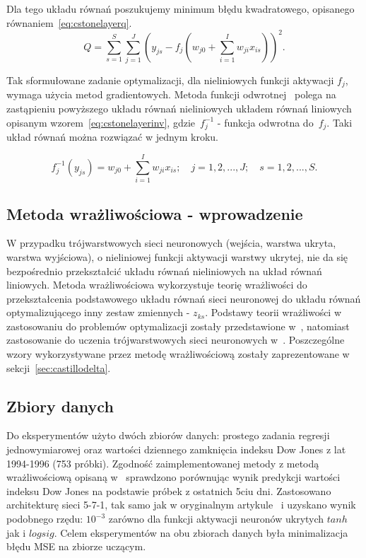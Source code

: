 \documentclass[11pt,a4paper]{article}
\begin{document}
Dla tego układu równań poszukujemy minimum błędu kwadratowego, opisanego równaniem~\ref{eq:cstonelayerq}.
\begin{equation}
Q = \sum_{s=1}^{S} \sum_{j=1}^{J} \left( y_{js} - f_j \left( w_{j0} + \sum_{i=1}^{I}w_{ji}x_{is} \right)\right)^{2}.
\label{eq:cstonelayerq}
\end{equation}

Tak sformułowane zadanie optymalizacji, dla nieliniowych funkcji aktywacji $f_j$, wymaga użycia metod gradientowych. Metoda funkcji odwrotnej~\cite{castillo2002global} polega na zastąpieniu powyższego układu równań nieliniowych układem równań liniowych opisanym wzorem~\ref{eq:cstonelayerinv}, gdzie~$f^{-1}_j$ - funkcja odwrotna do~$f_j$. Taki układ równań można rozwiązać w jednym kroku.

\begin{equation}
f^{-1}_j(y_{js}) =  w_{j0} + \sum_{i=1}^{I}w_{ji}x_{is}; \quad j = 1,2,...,J; \quad s = 1,2,...,S.
\label{eq:cstonelayerinv}
\end{equation}


\subsection{Metoda wrażliwościowa - wprowadzenie}
W przypadku trójwarstwowych sieci neuronowych (wejścia, warstwa ukryta, warstwa wyjściowa), o nieliniowej funkcji aktywacji warstwy ukrytej, nie da się bezpośrednio przekształcić układu równań nieliniowych na układ równań liniowych. Metoda wrażliwościowa wykorzystuje teorię wrażliwości do przekształcenia podstawowego układu równań sieci neuronowej do układu równań optymalizującego inny zestaw zmiennych - $z_{ks}$. Podstawy teorii wrażliwości w zastosowaniu do problemów optymalizacji zostały przedstawione w~\cite{castillo2004general}, natomiast zastosowanie do uczenia trójwarstwowych sieci neuronowych w~\cite{castillo2006very}. Poszczególne wzory wykorzystywane przez metodę wrażliwościową zostały zaprezentowane w sekcji~\ref{sec:castillodelta}.

\subsection{Zbiory danych}
Do eksperymentów użyto dwóch zbiorów danych: prostego zadania regresji jednowymiarowej oraz wartości dziennego zamknięcia indeksu Dow Jones z lat 1994-1996 (753 próbki). Zgodność zaimplementowanej metody z metodą wrażliwościową opisaną w~\cite{castillo2006very} sprawdzono porównując wynik predykcji wartości indeksu Dow Jones na podstawie próbek z ostatnich 5ciu dni. Zastosowano architekturę sieci 5-7-1, tak samo jak w oryginalnym artykule~\cite{castillo2006very} i uzyskano wynik podobnego rzędu: $10^{-3}$ zarówno dla funkcji aktywacji neuronów ukrytych $tanh$ jak i $logsig$. Celem eksperymentów na obu zbiorach danych była minimalizacja błędu MSE na zbiorze uczącym.
\end{document}
